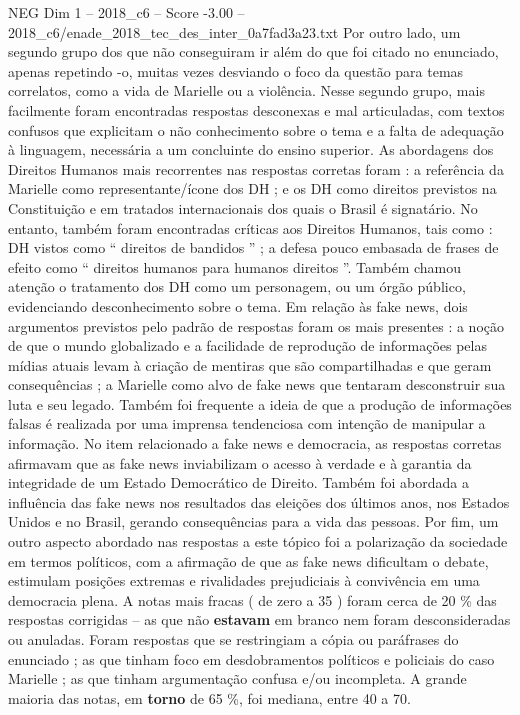 \begin{textsample}{NEG Dim 1 – 2018\_c6 – Score -3.00 – 2018\_c6/enade\_2018\_tec\_des\_inter\_0a7fad3a23.txt}
Por outro lado, um segundo grupo dos que não conseguiram ir além do que foi citado no enunciado, apenas repetindo -o, muitas vezes desviando o foco da questão para temas correlatos, como a vida de Marielle ou a violência.
Nesse segundo grupo, mais facilmente foram encontradas respostas desconexas e mal articuladas, com textos confusos que explicitam o não conhecimento sobre o tema e a falta de adequação à linguagem, necessária a um concluinte do ensino superior.
As abordagens dos Direitos Humanos mais recorrentes nas respostas corretas foram : a referência da Marielle como representante/ícone dos DH ; e os DH como direitos previstos na Constituição e em tratados internacionais dos quais o Brasil é signatário.
No entanto, também foram encontradas críticas aos Direitos Humanos, tais como : DH vistos como “ direitos de bandidos ” ; a defesa pouco embasada de frases de efeito como “ direitos humanos para humanos direitos ”.
Também chamou atenção o tratamento dos DH como um personagem, ou um órgão público, evidenciando desconhecimento sobre o tema.
Em relação às fake news, dois argumentos previstos pelo padrão de respostas foram os mais presentes : a noção de que o mundo globalizado e a facilidade de reprodução de informações pelas mídias atuais levam à criação de mentiras que são compartilhadas e que geram consequências ; a Marielle como alvo de fake news que tentaram desconstruir sua luta e seu legado.
Também foi frequente a ideia de que a produção de informações falsas é realizada por uma imprensa tendenciosa com intenção de manipular a informação.
No item relacionado a fake news e democracia, as respostas corretas afirmavam que as fake news inviabilizam o acesso à verdade e à garantia da integridade de um Estado Democrático de Direito.
Também foi abordada a influência das fake news nos resultados das eleições dos últimos anos, nos Estados Unidos e no Brasil, gerando consequências para a vida das pessoas.
Por fim, um outro aspecto abordado nas respostas a este tópico foi a polarização da sociedade em termos políticos, com a afirmação de que as fake news dificultam o debate, estimulam posições extremas e rivalidades prejudiciais à convivência em uma democracia plena.
A notas mais fracas ( de zero a 35 ) foram cerca de 20 \% das respostas corrigidas – as que não \textbf{estavam} em branco nem foram desconsideradas ou anuladas.
Foram respostas que se restringiam a cópia ou paráfrases do enunciado ; as que tinham foco em desdobramentos políticos e policiais do caso Marielle ; as que tinham argumentação confusa e/ou incompleta.
A grande maioria das notas, em \textbf{torno} de 65 \%, foi mediana, entre 40 a 70.

\end{textsample}
